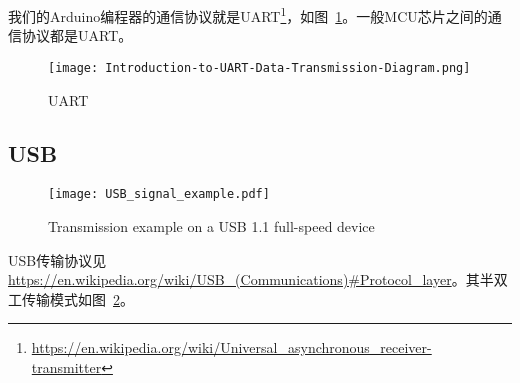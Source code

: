 我们的Arduino编程器的通信协议就是UART\footnote{\url{https://en.wikipedia.org/wiki/Universal_asynchronous_receiver-transmitter}}，如图~\ref{fig:UART}。一般MCU芯片之间的通信协议都是UART。

\begin{figure}[htbp]
    \centering
    \texttt{[image: Introduction-to-UART-Data-Transmission-Diagram.png]}
    \caption{UART}
    \label{fig:UART}
\end{figure}

\subsection{USB}


\begin{figure}[htbp]
    \centering
    \texttt{[image: USB\_signal\_example.pdf]}
    \caption{Transmission example on a USB 1.1 full-speed device}
    \label{fig:USB-Transmission}
\end{figure}

USB传输协议见\url{https://en.wikipedia.org/wiki/USB_(Communications)#Protocol_layer}。其半双工传输模式如图~\ref{fig:USB-Transmission}。





